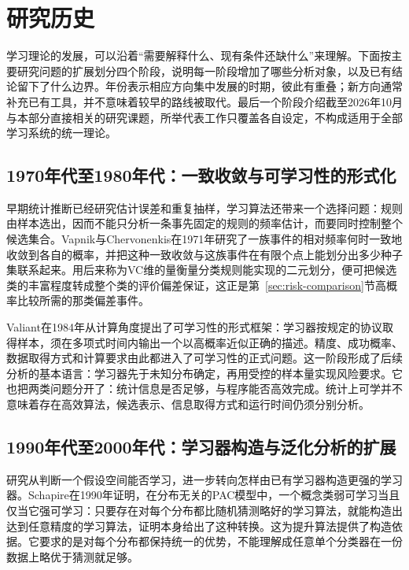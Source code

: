 \FloatBarrier

\section{研究历史}
\label{sec:learning-theory-research-history}

学习理论的发展，可以沿着“需要解释什么、现有条件还缺什么”来理解。下面按主要研究问题的扩展划分四个阶段，说明每一阶段增加了哪些分析对象，以及已有结论留下了什么边界。年份表示相应方向集中发展的时期，彼此有重叠；新方向通常补充已有工具，并不意味着较早的路线被取代。最后一个阶段介绍截至2026年10月与本部分直接相关的研究课题，所举代表工作只覆盖各自设定，不构成适用于全部学习系统的统一理论。

\subsection{1970年代至1980年代：一致收敛与可学习性的形式化}
\label{sec:history-uniform-convergence}

早期统计推断已经研究估计误差和重复抽样，学习算法还带来一个选择问题：规则由样本选出，因而不能只分析一条事先固定的规则的频率估计，而要同时控制整个候选集合。Vapnik与Chervonenkis在1971年研究了一族事件的相对频率何时一致地收敛到各自的概率，并把这种一致收敛与这族事件在有限个点上能划分出多少种子集联系起来。用后来称为VC维的量衡量分类规则能实现的二元划分，便可把候选类的丰富程度转成整个类的评价偏差保证，这正是第~\ref{sec:risk-comparison}节高概率比较所需的那类偏差事件。

Valiant在1984年从计算角度提出了可学习性的形式框架：学习器按规定的协议取得样本，须在多项式时间内输出一个以高概率近似正确的描述。精度、成功概率、数据取得方式和计算要求由此都进入了可学习性的正式问题。这一阶段形成了后续分析的基本语言：学习器先于未知分布确定，再用受控的样本量实现风险要求。它也把两类问题分开了：统计信息是否足够，与程序能否高效完成。统计上可学并不意味着存在高效算法，候选表示、信息取得方式和运行时间仍须分别分析。

\subsection{1990年代至2000年代：学习器构造与泛化分析的扩展}
\label{sec:history-constructions}

研究从判断一个假设空间能否学习，进一步转向怎样由已有学习器构造更强的学习器。Schapire在1990年证明，在分布无关的PAC模型中，一个概念类弱可学习当且仅当它强可学习：只要存在对每个分布都比随机猜测略好的学习算法，就能构造出达到任意精度的学习算法，证明本身给出了这种转换。这为提升算法提供了构造依据。它要求的是对每个分布都保持统一的优势，不能理解成任意单个分类器在一份数据上略优于猜测就足够。

